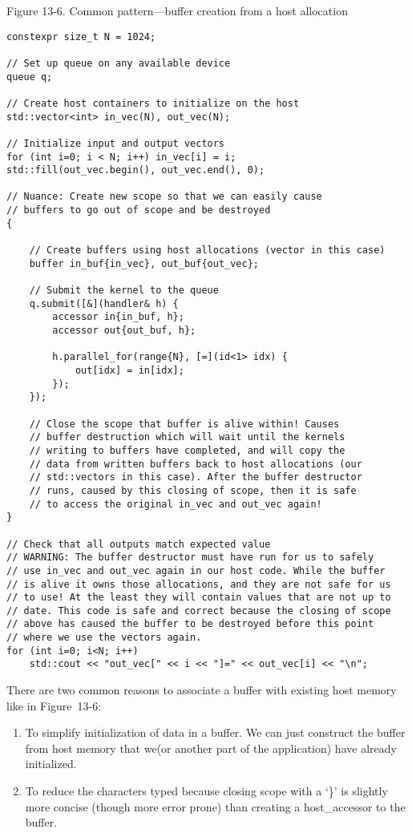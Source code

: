 \hspace*{\fill} \par %
Figure 13-6. Common pattern—buffer creation from a host allocation
\begin{lstlisting}[caption={}]
constexpr size_t N = 1024;

// Set up queue on any available device
queue q;

// Create host containers to initialize on the host
std::vector<int> in_vec(N), out_vec(N);

// Initialize input and output vectors
for (int i=0; i < N; i++) in_vec[i] = i;
std::fill(out_vec.begin(), out_vec.end(), 0);

// Nuance: Create new scope so that we can easily cause
// buffers to go out of scope and be destroyed
{
	
	// Create buffers using host allocations (vector in this case)
	buffer in_buf{in_vec}, out_buf{out_vec};
	
	// Submit the kernel to the queue
	q.submit([&](handler& h) {
		accessor in{in_buf, h};
		accessor out{out_buf, h};
		
		h.parallel_for(range{N}, [=](id<1> idx) {
			out[idx] = in[idx];
		});
	});

	// Close the scope that buffer is alive within! Causes
	// buffer destruction which will wait until the kernels
	// writing to buffers have completed, and will copy the
	// data from written buffers back to host allocations (our
	// std::vectors in this case). After the buffer destructor
	// runs, caused by this closing of scope, then it is safe
	// to access the original in_vec and out_vec again!
}

// Check that all outputs match expected value
// WARNING: The buffer destructor must have run for us to safely
// use in_vec and out_vec again in our host code. While the buffer
// is alive it owns those allocations, and they are not safe for us
// to use! At the least they will contain values that are not up to
// date. This code is safe and correct because the closing of scope
// above has caused the buffer to be destroyed before this point
// where we use the vectors again.
for (int i=0; i<N; i++) 
	std::cout << "out_vec[" << i << "]=" << out_vec[i] << "\n";
\end{lstlisting}

There are two common reasons to associate a buffer with existing host memory like in Figure 13-6:\par

\begin{enumerate}
	\item To simplify initialization of data in a buffer. We can just construct the buffer from host memory that we(or another part of the application) have already initialized.
	\item To reduce the characters typed because closing scope with a ‘\}’ is slightly more concise (though more error prone) than creating a host\_accessor to the buffer.
\end{enumerate}

